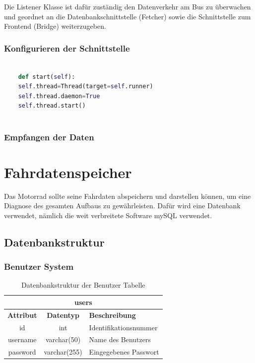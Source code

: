 Die Listener Klasse ist dafür zuständig den Datenverkehr am Bus zu überwachen und geordnet an die Datenbankschnittstelle (Fetcher) sowie die Schnittstelle zum Frontend (Bridge) weiterzugeben.

\subsubsection{Konfigurieren der Schnittstelle}
	
\begin{lstlisting}[language=Python, caption={Konfigurieren des CAN Adapters},captionpos=b]
	
	def start(self):
	self.thread=Thread(target=self.runner)
	self.thread.daemon=True
	self.thread.start()
	
\end{lstlisting}

\subsubsection{Empfangen der Daten}

\newpage


\section{Fahrdatenspeicher}

Das Motorrad sollte seine Fahrdaten abspeichern und darstellen können, um eine Diagnose des gesamten Aufbaus zu gewährleisten. Dafür wird eine Datenbank verwendet, nämlich die weit verbreitete Software mySQL verwendet.

\subsection{Datenbankstruktur}

\subsubsection{Benutzer System}

\begin{table}[H]
	\begin{center}
		\begin{tabular}{|c|c|l|}
		\hline
		\multicolumn{3}{|c|}{\textbf{users}}                          \\ \hline
		\textbf{Attribut} & \textbf{Datentyp} & \textbf{Beschreibung} \\ \hline
		id                & int               & Identifikationsnummer \\ \hline
		username          & varchar(50)       & Name des Benutzers    \\ \hline
		password          & varchar(255)      & Eingegebenes Passwort \\ \hline
		\end{tabular}
		\caption{Datenbankstruktur der Benutzer Tabelle}
		\label{tab:logindata}
	\end{center}
\end{table}

